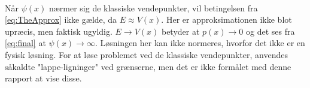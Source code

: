 \\
Når $\psi(x)$ nærmer sig de klassiske vendepunkter, vil betingelsen fra \cref{eq:TheApprox} ikke gælde, da $E \approx V(x)$. Her er approksimationen ikke blot upræcis, men faktisk ugyldig. $E \rightarrow V(x)$ betyder at $p(x) \rightarrow 0$ og det ses fra \cref{eq:final}  at $\psi(x) \rightarrow \infty$. Løsningen her kan ikke normeres, hvorfor det ikke er en fysisk løsning. For at løse problemet ved de klassiske vendepunkter, anvendes såkaldte "lappe-ligninger" ved grænserne, men det er ikke formålet med denne rapport at vise disse.
